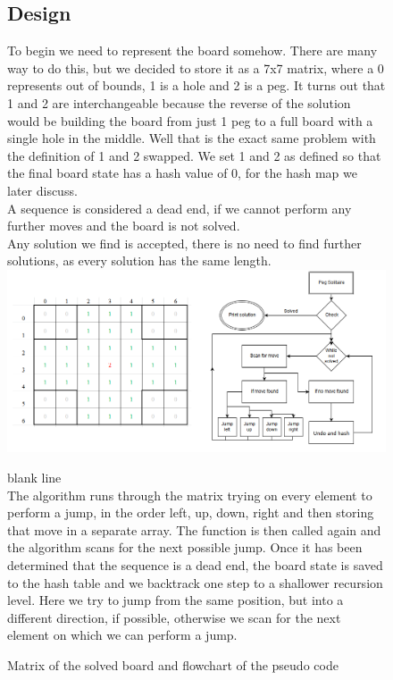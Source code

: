 \documentclass[11pt]{article}
\begin{document}
\begin{figure}
\subsection{Design}
To begin we need to represent the board somehow. There are many way to do this, but we decided to store it as a 7x7 matrix, where a 0 represents out of bounds, 1 is a hole and 2 is a peg. It turns out that 1 and 2 are interchangeable because the reverse of the solution would be building the board from just 1 peg to a full board with a single hole in the middle. Well that is the exact same problem with the definition of 1 and 2 swapped. We set 1 and 2 as defined so that the final board state has a hash value of 0, for the hash map we later discuss.\\
A sequence is considered a dead end, if we cannot perform any further moves and the board is not solved.\\
Any solution we find is accepted, there is no need to find further solutions, as every solution has the same length.\\\newline
\includegraphics[width=15cm]{6}
\caption{Matrix of the solved board and flowchart of the pseudo code}
\label{fig:2}
\color{white} blank line\\
\color{black}
The algorithm runs through the matrix trying on every element to perform a jump, in the order left, up, down, right and then storing that move in a separate array. The function is then called again and the algorithm scans for the next possible jump. Once it has been determined that the sequence is a dead end, the board state is saved to the hash table and we backtrack one step to a shallower recursion level. Here we try to jump from the same position, but into a different direction, if possible, otherwise we scan for the next element on which we can perform a jump.
\end{figure}
\newpage
\end{document}
